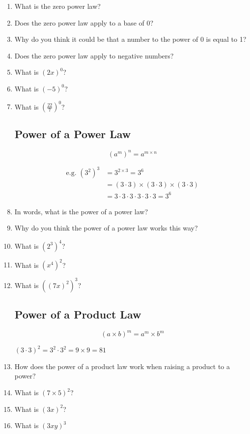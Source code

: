 \documentclass{article}
\begin{document}
\begin{enumerate}
\item What is the zero power law?
\item Does the zero power law apply to a base of 0?
\item Why do you think it could be that a number to the power of 0 is equal to 1?
\item Does the zero power law apply to negative numbers?
\item What is $(2x)^0$?
\item What is $(-5)^0$?
\item What is $(\frac{22}{7})^0$?

\subsection*{Power of a Power Law}
\begin{Large}
$$(a^m)^n=a^{m \times n}$$
\end{Large}
\begin{align*}
\text{e.g. }(3^2)^3&=3^{2 \times 3}=3^6\\
&=(3 \cdot 3) \times (3 \cdot 3) \times (3\cdot 3)\\
&= 3 \cdot 3 \cdot 3 \cdot 3 \cdot 3 \cdot 3=3^6
\end{align*}

\item In words, what is the power of a power law?
\item Why do you think the power of a power law works this way?
\item What is $(2^3)^4$?
\item What is $(x^4)^2$?
\item What is $((7x)^2)^3$?

\subsection*{Power of a Product Law}

\begin{Large}
$$(a \times b)^m=a^m \times b^m$$
\end{Large}

\begin{center}
\begin{large}
$(3 \cdot 3)^2=3^2 \cdot 3^2=9\times9=81$
\end{large}
\end{center}

\item How does the power of a product law work when raising a product to a power?
\item What is $(7 \times 5)^2$?
\item What is $(3x)^2$?
\item What is $(3xy)^3$


\end{enumerate}
\end{document}
